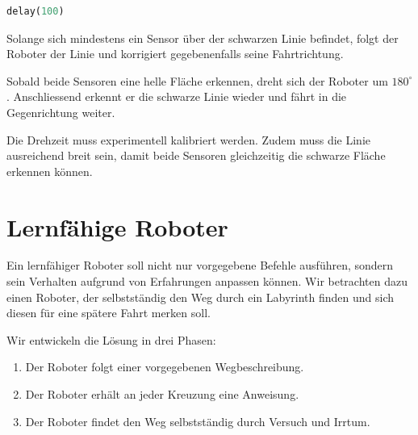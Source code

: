 \begin{myexercise}
\begin{myanswer}
\begin{lstlisting}[language=Python]
    delay(100)
        \end{lstlisting}

        Solange sich mindestens ein Sensor über der
        schwarzen Linie befindet, folgt der Roboter
        der Linie und korrigiert gegebenenfalls
        seine Fahrtrichtung.

        Sobald beide Sensoren eine helle Fläche
        erkennen, dreht sich der Roboter um
        \(180^\circ\). Anschliessend erkennt er
        die schwarze Linie wieder und fährt in
        die Gegenrichtung weiter.

        Die Drehzeit muss experimentell kalibriert
        werden. Zudem muss die Linie ausreichend
        breit sein, damit beide Sensoren gleichzeitig
        die schwarze Fläche erkennen können.
    \end{myanswer}
\end{myexercise}

































\section{Lernfähige Roboter}

Ein lernfähiger Roboter soll nicht nur vorgegebene Befehle
ausführen, sondern sein Verhalten aufgrund von Erfahrungen
anpassen können. Wir betrachten dazu einen Roboter, der
selbstständig den Weg durch ein Labyrinth finden und sich
diesen für eine spätere Fahrt merken soll.

Wir entwickeln die Lösung in drei Phasen:
\begin{enumerate}
    \item Der Roboter folgt einer vorgegebenen Wegbeschreibung.
    \item Der Roboter erhält an jeder Kreuzung eine Anweisung.
    \item Der Roboter findet den Weg selbstständig durch
          Versuch und Irrtum.
\end{enumerate}

